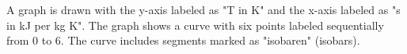 A graph is drawn with the y-axis labeled as "T in K" and the x-axis labeled as "s in kJ per kg K". The graph shows a curve with six points labeled sequentially from 0 to 6. The curve includes segments marked as "isobaren" (isobars).
